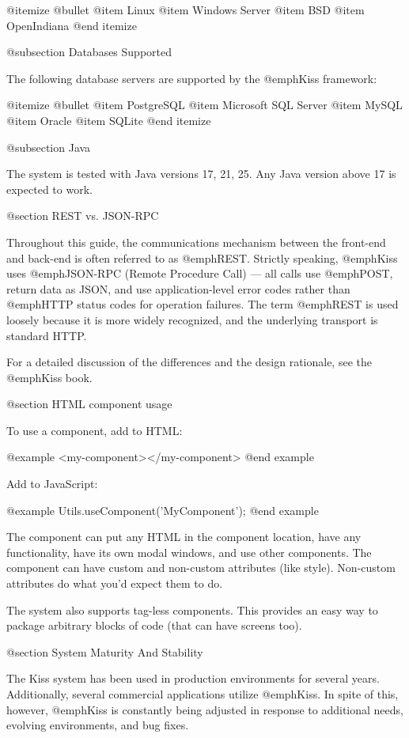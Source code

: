 @itemize @bullet
@item
Linux
@item
Windows Server
@item
BSD
@item
OpenIndiana
@end itemize


@subsection Databases Supported


The following database servers are supported by the @emph{Kiss}
framework:

@itemize @bullet
@item
PostgreSQL
@item
Microsoft SQL Server
@item
MySQL
@item
Oracle
@item
SQLite
@end itemize


@subsection Java

The system is tested with Java versions 17, 21, 25.  Any Java version above 17 
is expected to work.

@section REST vs. JSON-RPC

Throughout this guide, the communications mechanism between the
front-end and back-end is often referred to as @emph{REST}.  Strictly
speaking, @emph{Kiss} uses @emph{JSON-RPC} (Remote Procedure
Call) --- all calls use @emph{POST}, return data as JSON, and use
application-level error codes rather than @emph{HTTP} status codes for
operation failures.  The term @emph{REST} is used loosely because it is
more widely recognized, and the underlying transport is standard HTTP.

For a detailed discussion of the differences and the design rationale,
see the @emph{Kiss} book.





@section HTML component usage
   
To use a component, add to HTML:

@example
<my-component></my-component>
@end example

Add to JavaScript:

@example
Utils.useComponent('MyComponent');
@end example
    
The component can put any HTML in the component location, have any
functionality, have its own modal windows, and use other components.
The component can have custom and non-custom attributes (like style).
Non-custom attributes do what you'd expect them to do.

The system also supports tag-less components.  This provides an easy
way to package arbitrary blocks of code (that can have screens too).

@section System Maturity And Stability

The Kiss system has been used in production environments for several
years.  Additionally, several commercial applications utilize @emph{Kiss}.
In spite of this, however, @emph{Kiss} is constantly being adjusted
in response to additional needs, evolving environments, and bug fixes.

